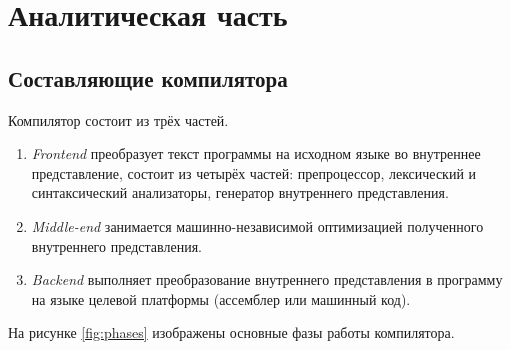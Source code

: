 \section{Аналитическая часть}

\subsection{Составляющие компилятора}
Компилятор состоит из трёх частей.
\begin{enumerate}
	\item \textit{Frontend} преобразует текст программы на исходном языке во внутреннее представление, состоит из четырёх частей: препроцессор, лексический и синтаксический анализаторы, генератор внутреннего представления.  
	
	\item \textit{Middle-end} занимается машинно-независимой оптимизацией полученного внутреннего представления.
	
	\item \textit{Backend} выполняет преобразование внутреннего представления в программу на языке целевой платформы (ассемблер или машинный код).
\end{enumerate}

На рисунке \ref{fig:phases} изображены основные фазы работы компилятора.

